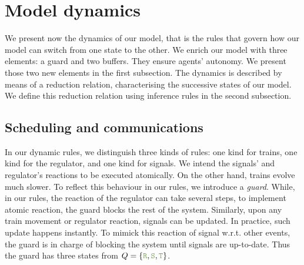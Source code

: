 \documentclass[runningheads]{llncs}
\newcommand{\guardFmt}[1]{{\color{guardcolor} \ensuremath{\mathtt{#1}}}}
\newcommand{\guardT}{\guardFmt{T}}
\newcommand{\guardS}{\guardFmt{S}}
\newcommand{\guardR}{\guardFmt{R}}
\begin{document}
\section{Model dynamics}
\label{sec:model_semantics}

We present now the dynamics of our model, that is the rules that govern how our model can switch from one state to the other.
We enrich our model with three elements: a guard and two buffers. They ensure agents' autonomy. %
We present those two new elements in the first subsection.
The dynamics is described by means of a reduction relation, characterising the successive states of our model. We define this reduction relation using inference rules in the second subsection.

\subsection{Scheduling and communications}

In our dynamic rules, we distinguish three kinds of rules: one kind for trains, one kind for the regulator, and one kind for  signals. We intend the signals' and regulator's reactions to be executed atomically. On the other hand, trains evolve much slower. To reflect this behaviour in our rules, we introduce a \emph{guard}. While, in our rules, the reaction of the regulator can take several steps, to implement atomic reaction, the guard blocks the rest of the system. Similarly, upon any train movement or regulator reaction, signals can be updated. In practice, such update happens instantly. To mimick this reaction of signal w.r.t. other events, the guard is in charge of blocking the system until signals are up-to-date. Thus the guard has three states from $Q = \{\guardR, \guardS, \guardT\}$.

%		
\end{document}
